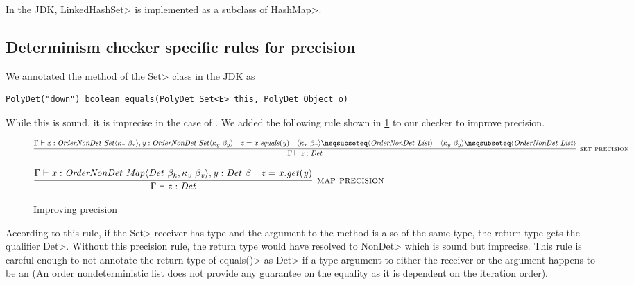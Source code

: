 In the JDK, \<LinkedHashSet> is implemented as a subclass of \<HashMap>.

\subsection{Determinism checker specific rules for precision}\label{precision}
We annotated the  method of the \<Set> class in the JDK as
\begin{verbatim}
PolyDet("down") boolean equals(PolyDet Set<E> this, PolyDet Object o)
\end{verbatim}
While this is sound, it is imprecise in the case of . We added the following rule shown in \cref{fig-precision-rules} to our checker to improve precision.
\begin{figure}
    $\infer[\rulename{set precision}]{\Gamma \vdash \|z : Det|}{\Gamma \vdash \|x| : \|OrderNonDet| \ \|Set|\angles{ \kappa_{x} \ \beta_{x}}, \|y| : \|OrderNonDet| \ \|Set|\angles{ \kappa_{y} \ \beta_{y}} & \|z = x.equals(y)| & \angles{ \kappa_{x} \ \beta_{x}} \nsqsubseteq \angles{ \|OrderNonDet \ List| } & \angles{ \kappa_{y} \ \beta_{y}} \nsqsubseteq \angles{ \|OrderNonDet \ List| } }$
    
    \bigskip
    
    $\infer[\rulename{map precision}]{\Gamma \vdash \|z : Det|}{\Gamma \vdash \|x : OrderNonDet \ Map\angles{ Det \ \beta_k, \kappa_v\ \beta_v }, y : Det \ \beta| & \|z = x.get(y)|}$
    
    \caption{Improving precision}
    \label{fig-precision-rules}
\end{figure}
According to this rule, if the \<Set> receiver has type  and the argument to the  method is
also of the same type, the return type gets the qualifier \<Det>. Without this precision rule, the return type would have resolved to \<NonDet> which
is sound but imprecise. This rule is careful enough to not annotate the return type of \<equals()> as \<Det> if a type argument to either the
receiver or the argument happens to be an  (An order nondeterministic list does not provide any guarantee on the
equality as it is dependent on the iteration order). 

